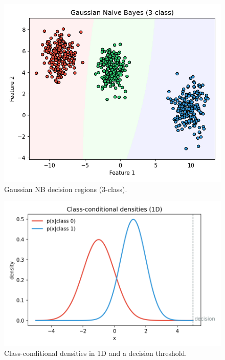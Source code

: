 \documentclass[11pt]{article}
\begin{document}
\begin{figure}[H]
  \centering
  \includegraphics[width=0.9\linewidth]{gnb_decision_boundary_3class.png}
  \caption{Gaussian NB decision regions (3-class).}
  \label{fig:gnb3}
\end{figure}
\FloatBarrier

\begin{figure}[H]
  \centering
  \includegraphics[width=0.9\linewidth]{class_conditional_densities_1d.png}
  \caption{Class-conditional densities in 1D and a decision threshold.}
  \label{fig:dens1d}
\end{figure}
\FloatBarrier
\end{document}
